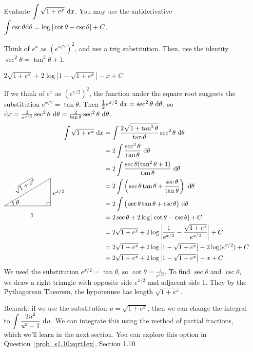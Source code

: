 \begin{question}\label{prob_s1.9:sqrt1ex}
Evaluate $\displaystyle\int \sqrt{1+e^x}~\mathrm{d}x$.
You may use the antiderivative $\displaystyle\int \csc \theta \mathrm{d}\theta = \log|\cot \theta - \csc \theta|+C$.
\end{question}
\begin{hint} Think of $e^x$ as $\left(e^{x/2}\right)^2$, and use a trig substitution. Then, use the identity $\sec^2 \theta = \tan^2 \theta +1$.
\end{hint}
\begin{answer}
$2\sqrt{1+e^x}+2\log\left| 1-\sqrt{1+e^x} \right|-x+C
$
\end{answer}
\begin{solution}
If we think of $e^x$ as $\left(e^{x/2}\right)^2$, the function under the square root suggests the substitution $e^{x/2}=\tan \theta$. Then $\frac{1}{2}e^{x/2}~\mathrm{d}x=\sec^2\theta~\mathrm{d}\theta$, so $\mathrm{d}x = \frac{2}{e^{x/2}}\sec^2\theta~\mathrm{d}\theta = \frac{2}{\tan\theta}\sec^2\theta~\mathrm{d}\theta$.
\begin{align*}
\int \sqrt{1+e^x}~\dee{x}&=\int\frac{2\sqrt{1+\tan^2 \theta}}{\tan\theta}\sec^2\theta~\dee{\theta}\\
&=2\int \frac{\sec^3\theta}{\tan\theta}~\dee{\theta}\\
&=2\int \frac{\sec\theta(\tan^2\theta+1)}{\tan\theta}~\dee{\theta}\\
&=2\int \left(\sec\theta \tan\theta + \frac{\sec \theta}{\tan\theta}\right)~\dee{\theta}\\
&=2\int\big( \sec\theta \tan\theta + \csc\theta\big)~\dee{\theta}\\
\smash{\trigtri{\theta}{1}{e^{x/2}}{\sqrt{1+e^x}}}\hspace{2cm}&=2\sec\theta + 2\log|\cot\theta-\csc\theta|+C\\
&=2\sqrt{1+e^x}+2\log\left| \frac{1}{e^{x/2}} - \frac{\sqrt{1+e^x}}{e^{x/2}} \right|+C\\
&=2\sqrt{1+e^x}+2\log\left| 1-\sqrt{1+e^x} \right|-2\log(e^{x/2})+C
\\&=2\sqrt{1+e^x}+2\log\left| 1-\sqrt{1+e^x} \right|-x+C
\end{align*}
We used the substitution $e^{x/2}=\tan\theta$, so $\cot\theta = \frac{1}{e^{x/2}}$. To find $\sec \theta$ and $\csc\theta$, we draw a right triangle with opposite side $e^{x/2}$ and adjacent side 1. They by the Pythagorean Theorem, the hypotenuse has length $\sqrt{1+e^x}$.

Remark: if we use the substitution $u=\sqrt{1+e^x}$, then we can change the integral to $\displaystyle\int \dfrac{2u^2}{u^2-1}~\mathrm{d}u$. We can integrate this using the method of partial fractions, which we'll learn in the next section. You can explore this option in Question~\ref{prob_s1.10:sqrt1ex}, Section 1.10.
\end{solution}

